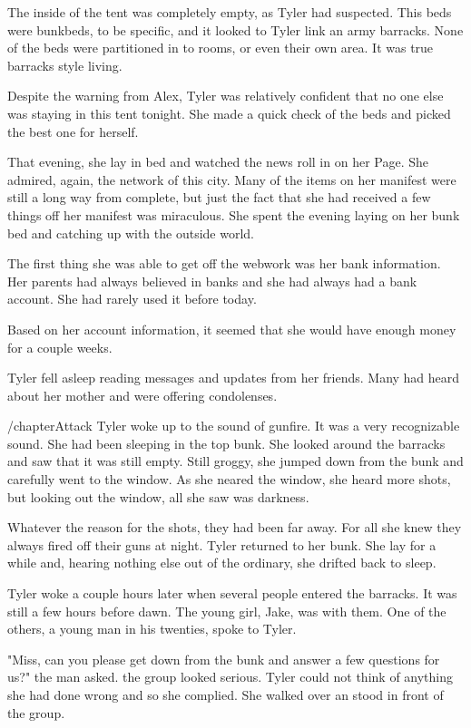 \documentclass[courier]{sffms}
\begin{document}
The inside of the tent was completely empty, as Tyler had suspected.
This beds were bunkbeds, to be specific, and it looked to Tyler
link an army barracks. None of the beds were partitioned in to rooms,
or even their own area. It was true barracks style living.

Despite the warning from Alex, Tyler was relatively confident that
no one else was staying in this tent tonight. She made a quick check 
of the beds and picked the best one for herself.

That evening, she lay in bed and watched the news roll in on her Page.
She admired, again, the network of this city. Many of the items on her
manifest were still a long way from complete, but just the fact that
she had received a few things off her manifest was miraculous. She
spent the evening laying on her bunk bed and catching up with the
outside world.

The first thing she was able to get off the webwork was her bank
information. Her parents had always believed in banks and she
had always had a bank account. She had rarely used it before today.

Based on her account information, it seemed that she would have
enough money for a couple weeks.

Tyler fell asleep reading messages and updates from her friends. Many
had heard about her mother and were offering condolenses.

/chapter{Attack}
Tyler woke up to the sound of gunfire. It was a very recognizable
sound. She had been sleeping in the top bunk. She looked around the
barracks and saw that it was still empty. Still groggy, she jumped down
from the bunk and carefully went to the window. As she neared the
window, she heard more shots, but looking out the window, all she
saw was darkness.

Whatever the reason for the shots, they had been
far away. For all she knew they always fired off their guns at night.
Tyler returned to her bunk. She lay for a while and, hearing nothing
else out of the ordinary, she drifted back to sleep.

Tyler woke a couple hours later when several people entered the
barracks. It was still a few hours before
dawn. The young girl, Jake, was with them. One of the others, a
young man in his twenties, spoke to Tyler.

"Miss, can you please get down from the bunk and answer a few
questions for us?" the man asked. the group looked serious.
Tyler could not think of anything she had done wrong and so she
complied. She walked over an stood in front of the group.
\end{document}
